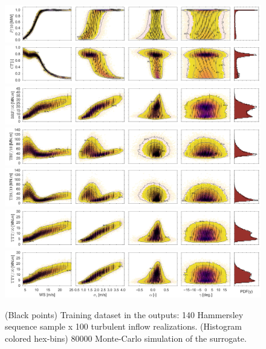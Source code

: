 \documentclass[preprint,12pt]{elsarticle}
\begin{document}
\begin{figure}[p]
\begin{centering}
\includegraphics[width=\linewidth]{Figures/Full_surrogate_red_file/P_PCE_MC_surrogate_last_row.jpg} \\
\includegraphics[width=\linewidth]{Figures/Full_surrogate_red_file/CT_PCE_MC_surrogate_last_row.jpg} \\
\includegraphics[width=\linewidth]{Figures/Full_surrogate_red_file/BRFBM_EFL_M12_PCE_MC_surrogate_last_row.jpg} \\
\includegraphics[width=\linewidth]{Figures/Full_surrogate_red_file/TBFBM_EFL_M4_PCE_MC_surrogate_last_row.jpg} \\
\includegraphics[width=\linewidth]{Figures/Full_surrogate_red_file/TBSBM_EFL_M4_PCE_MC_surrogate_last_row.jpg} \\
\includegraphics[width=\linewidth]{Figures/Full_surrogate_red_file/TTTBM_EFL_M4_PCE_MC_surrogate_last_row.jpg} \\
\includegraphics[width=\linewidth]{Figures/Full_surrogate_red_file/TTYBM_EFL_M4_PCE_MC_surrogate_last_row.jpg}
\caption{(Black points) Training dataset in the outputs: 140 Hammersley sequence sample x 100 turbulent inflow realizations. (Histogram colored hex-bins) 80000 Monte-Carlo simulation of the surrogate.}
\label{fig_final_surrogates}
\end{centering}
\end{figure}
\end{document}
